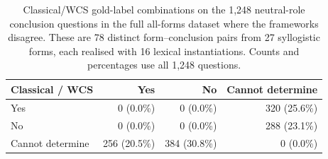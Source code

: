 \begin{table}[H]
\centering
\caption{Classical/WCS gold-label combinations on the 1,248 neutral-role conclusion questions in the full all-forms dataset where the frameworks disagree. These are 78 distinct form--conclusion pairs from 27 syllogistic forms, each realised with 16 lexical instantiations. Counts and percentages use all 1,248 questions.}
\label{tab:classical-wcs-disagreement-heatmap-final2}
\begin{tabular}{lrrr}
\toprule
Classical / WCS & Yes & No & Cannot determine \\
\midrule
Yes & \cellcolor{blue!0}0 (0.0\%) & \cellcolor{blue!0}0 (0.0\%) & \cellcolor{blue!26}320 (25.6\%) \\
No & \cellcolor{blue!0}0 (0.0\%) & \cellcolor{blue!0}0 (0.0\%) & \cellcolor{blue!23}288 (23.1\%) \\
Cannot determine & \cellcolor{blue!21}256 (20.5\%) & \cellcolor{blue!31}384 (30.8\%) & \cellcolor{blue!0}0 (0.0\%) \\
\bottomrule
\end{tabular}
\end{table}
